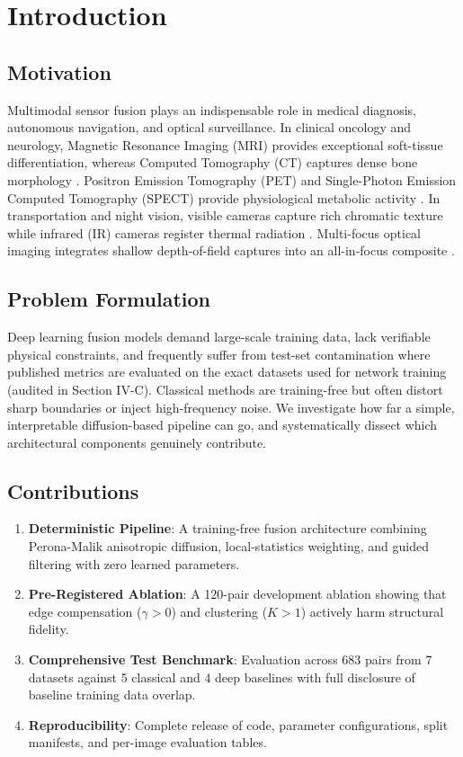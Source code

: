 \documentclass[conference]{IEEEtran}
\begin{document}
\section{Introduction}
\subsection{Motivation}
Multimodal sensor fusion plays an indispensable role in medical diagnosis, autonomous navigation, and optical surveillance. In clinical oncology and neurology, Magnetic Resonance Imaging (MRI) provides exceptional soft-tissue differentiation, whereas Computed Tomography (CT) captures dense bone morphology \cite{ref_harvard}. Positron Emission Tomography (PET) and Single-Photon Emission Computed Tomography (SPECT) provide physiological metabolic activity \cite{ref_harvard}. In transportation and night vision, visible cameras capture rich chromatic texture while infrared (IR) cameras register thermal radiation \cite{ref_tno, ref_piafusion}. Multi-focus optical imaging integrates shallow depth-of-field captures into an all-in-focus composite \cite{ref_lytro}.

\subsection{Problem Formulation}
Deep learning fusion models demand large-scale training data, lack verifiable physical constraints, and frequently suffer from test-set contamination where published metrics are evaluated on the exact datasets used for network training (audited in Section IV-C). Classical methods are training-free but often distort sharp boundaries or inject high-frequency noise. We investigate how far a simple, interpretable diffusion-based pipeline can go, and systematically dissect which architectural components genuinely contribute.

\subsection{Contributions}
\begin{enumerate}
    \item \textbf{Deterministic Pipeline}: A training-free fusion architecture combining Perona-Malik anisotropic diffusion, local-statistics weighting, and guided filtering with zero learned parameters.
    \item \textbf{Pre-Registered Ablation}: A 120-pair development ablation showing that edge compensation ($\gamma > 0$) and clustering ($K > 1$) actively harm structural fidelity.
    \item \textbf{Comprehensive Test Benchmark}: Evaluation across 683 pairs from 7 datasets against 5 classical and 4 deep baselines with full disclosure of baseline training data overlap.
    \item \textbf{Reproducibility}: Complete release of code, parameter configurations, split manifests, and per-image evaluation tables.
\end{enumerate}
\end{document}

